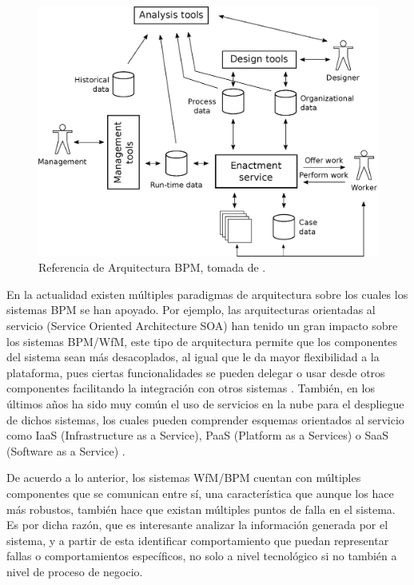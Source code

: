 \begin{figure}[htbp!] 
    \centering    
    \includegraphics[width=1.0\textwidth]{Chapter1/Figs/Vector/Figure_referenceBPM}
    \caption[Referencia de Arquitectura BPM]{Referencia de Arquitectura BPM, tomada de \cite[Fig.~15]{VanderAalst2013}.}
    \label{fig:ReferenceBPM}
\end{figure}

En la actualidad existen múltiples paradigmas de arquitectura sobre los cuales los sistemas BPM se han apoyado. Por ejemplo, las arquitecturas orientadas al servicio (Service Oriented Architecture SOA) han tenido un gran impacto sobre los sistemas BPM/WfM, este tipo de arquitectura permite que los componentes del sistema sean más desacoplados, al igual que le da mayor flexibilidad a la plataforma, pues ciertas funcionalidades se pueden delegar o usar desde otros componentes facilitando la integración con otros sistemas \cite{VanderAalst2013}. También, en los últimos años ha sido muy común el uso de servicios en la nube para el despliegue de dichos sistemas, los cuales pueden comprender esquemas orientados al servicio como IaaS (Infrastructure as a Service), PaaS (Platform as a Services) o SaaS (Software as a Service) \cite{VanderAalst2013}. 

De acuerdo a lo anterior, los sistemas WfM/BPM cuentan con múltiples componentes que se comunican entre sí, una característica que aunque los hace más robustos, también hace que existan múltiples puntos de falla en el sistema. Es por dicha razón, que es interesante analizar la información generada por el sistema, y a partir de esta identificar comportamiento que puedan representar fallas o comportamientos específicos, no solo a nivel tecnológico si no también a nivel de proceso de negocio.

